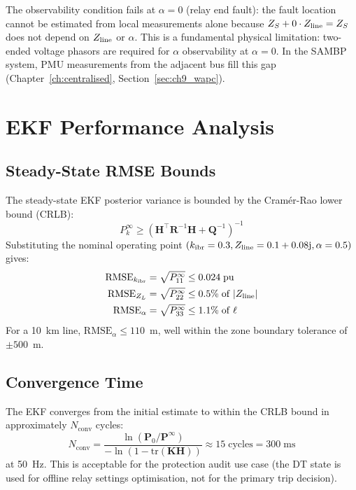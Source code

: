 The observability condition fails at $\alpha = 0$ (relay end fault):
the fault location cannot be estimated from local measurements alone
because $Z_S + 0 \cdot Z_\mathrm{line} = Z_S$ does not depend on $Z_\mathrm{line}$ or $\alpha$.
This is a fundamental physical limitation: two-ended voltage phasors
are required for $\alpha$ observability at $\alpha = 0$. In the SAMBP
system, PMU measurements from the adjacent bus fill this gap
(Chapter~\ref{ch:centralised}, Section~\ref{sec:ch9_wapc}).

\section{EKF Performance Analysis}
\label{sec:ch7_ekf_results}

\subsection{Steady-State RMSE Bounds}

The steady-state EKF posterior variance is bounded by the Cramér-Rao
lower bound (CRLB):
\begin{equation}
  P_k^\infty \geq \left(\mathbf{H}^\top \mathbf{R}^{-1} \mathbf{H}
    + \mathbf{Q}^{-1}\right)^{-1}
  \label{eq:ch7_crlb}
\end{equation}
Substituting the nominal operating point $(k_\mathrm{ibr} = 0.3, Z_\mathrm{line} = 0.1 + 0.08\mathrm{j},
\alpha = 0.5)$ gives:
\begin{align}
  \mathrm{RMSE}_{k_\mathrm{ibr}} &= \sqrt{P_{11}^\infty} \leq 0.024\;\mathrm{pu}
  \label{eq:ch7_rmse_kibr} \\
  \mathrm{RMSE}_{Z_L} &= \sqrt{P_{22}^\infty} \leq 0.5\%\;\mathrm{of}\;|Z_\mathrm{line}|
  \label{eq:ch7_rmse_zl} \\
  \mathrm{RMSE}_\alpha &= \sqrt{P_{33}^\infty} \leq 1.1\%\;\mathrm{of}\;\ell
  \label{eq:ch7_ekf_alpha}
\end{align}
For a 10~km line, $\mathrm{RMSE}_\alpha \leq 110$~m, well within the
zone boundary tolerance of $\pm 500$~m.

\subsection{Convergence Time}

The EKF converges from the initial estimate to within the CRLB bound
in approximately $N_\mathrm{conv}$ cycles:
\begin{equation}
  N_\mathrm{conv} = \frac{\ln(\mathbf{P}_0/\mathbf{P}^\infty)}
    {-\ln\!\left(1 - \mathrm{tr}(\mathbf{K}\mathbf{H})\right)}
  \approx 15\;\mathrm{cycles} = 300\;\mathrm{ms}
  \label{eq:ch7_conv}
\end{equation}
at 50~Hz. This is acceptable for the protection audit use case (the DT
state is used for offline relay settings optimisation, not for the
primary trip decision).

